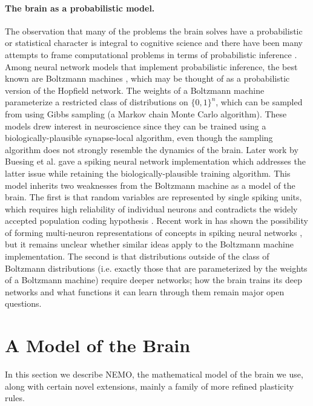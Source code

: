 \documentclass{article}
\theoremstyle{remark}
\newcommand{\1}{\mathbbm{1}}
\begin{document}
\paragraph{The brain as a probabilistic model.} The observation that many of the problems the brain solves have a probabilistic or statistical character is integral to cognitive science \cite{rao2002probabilistic, doya2007bayesian} and there have been many attempts to frame computational problems in terms of probabilistic inference \cite{lee2003hierarchical, kersten2004object, kording2004bayesian}. Among neural network models that implement probabilistic inference, the best known are Boltzmann machines \cite{ackley1985learning}, which may be thought of as a probabilistic version of the Hopfield network. The weights of a Boltzmann machine parameterize a restricted class of distributions on $\{0, 1\}^n$, which can be sampled from using Gibbs sampling (a Markov chain Monte Carlo algorithm). These models drew interest in neuroscience since they can be trained using a biologically-plausible synapse-local algorithm, even though the sampling algorithm does not strongly resemble the dynamics of the brain. Later work by Buesing et al. \cite{buesing2011neural} gave a spiking neural network implementation which addresses the latter issue while retaining the biologically-plausible training algorithm. This model inherits two weaknesses from the Boltzmann machine as a model of the brain. The first is that random variables are represented by single spiking units, which requires high reliability of individual neurons and contradicts the widely accepted population coding hypothesis \cite{pouget2000information}. Recent work in has shown the possibility of forming multi-neuron representations of concepts in spiking neural networks \cite{lynch2024multi}, but it remains unclear whether similar ideas apply to the Boltzmann machine implementation. The second is that distributions outside of the class of Boltzmann distributions (i.e. exactly those that are parameterized by the weights of a Boltzmann machine) require deeper networks; how the brain trains its deep networks and what functions it can learn through them remain major open questions.

\section{A Model of the Brain}
In this section we describe NEMO, the mathematical model of the brain we use, along with certain novel extensions, mainly a family of more refined plasticity rules.
\end{document}
